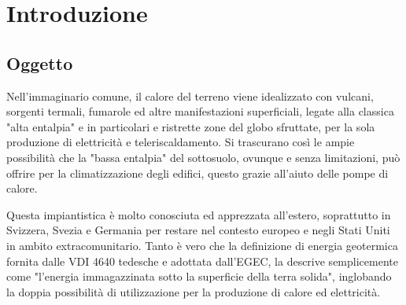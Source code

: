 {}
\chapter*{Introduzione}

\section*{Oggetto} %
%
Nell'immaginario comune, il calore del terreno viene idealizzato con vulcani, sorgenti termali, fumarole ed altre manifestazioni superficiali, legate alla classica "alta entalpia" e in particolari e ristrette zone del globo sfruttate, per la sola produzione di elettricità e teleriscaldamento. Si trascurano così le ampie possibilità che la "bassa entalpia" del sottosuolo, ovunque e senza limitazioni, può offrire per la climatizzazione degli edifici, questo grazie all'aiuto delle pompe di calore.



Questa impiantistica è molto conosciuta ed apprezzata all'estero, soprattutto in Svizzera, Svezia e Germania per restare nel contesto europeo e negli Stati Uniti in ambito extracomunitario. Tanto è vero che la definizione di energia geotermica fornita dalle VDI 4640 tedesche e adottata dall'EGEC, la descrive semplicemente come "l'energia immagazzinata sotto la superficie della terra solida", inglobando la doppia possibilità di utilizzazione per la produzione di calore ed elettricità.

